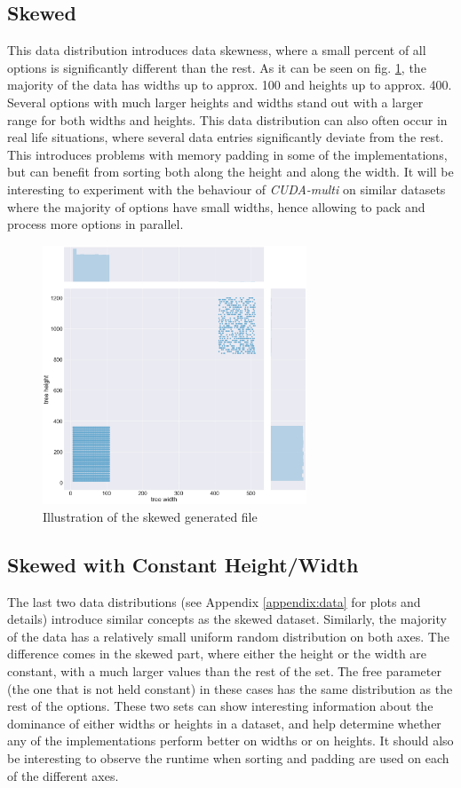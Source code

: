 \subsection{Skewed}
This data distribution introduces data skewness, where a small percent of all options is significantly different than the rest. As it can be seen on fig. \ref{fig:experimentmethodology:skewed}, the majority of the data has widths up to approx. 100 and heights up to approx. 400. Several options with much larger heights and widths stand out with a larger range for both widths and heights. This data distribution can also often occur in real life situations, where several data entries significantly deviate from the rest. This introduces problems with memory padding in some of the implementations, but can benefit from sorting both along the height and along the width. It will be interesting to experiment with the behaviour of \textit{CUDA-multi} on similar datasets where the majority of options have small widths, hence allowing to pack and process more options in parallel. 

\begin{figure}[H]
	\centering
	\includegraphics[width=0.7\textwidth]{img/4_SKEWED_plot.png}
	\caption{Illustration of the skewed generated file}
	\label{fig:experimentmethodology:skewed}
\end{figure}

\subsection{Skewed with Constant Height/Width}
The last two data distributions (see Appendix \ref{appendix:data} for plots and details) introduce similar concepts as the skewed dataset. Similarly, the majority of the data has a relatively small uniform random distribution on both axes. The difference comes in the skewed part, where either the height or the width are constant, with a much larger values than the rest of the set. Тhe free parameter (the one that is not held constant) in these cases has the same distribution as the rest of the options. These two sets can show interesting information about the dominance of either widths or heights in a dataset, and help determine whether any of the implementations perform better on widths or on heights. It should also be interesting to observe the runtime when sorting and padding are used on each of the different axes. 

